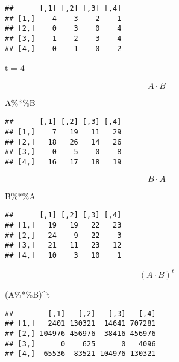 \documentclass[
]{article}
\newenvironment{Shaded}{\begin{snugshade}}{\end{snugshade}}
\newcommand{\DecValTok}[1]{\textcolor[rgb]{0.00,0.00,0.81}{#1}}
\newcommand{\NormalTok}[1]{#1}
\newcommand{\OtherTok}[1]{\textcolor[rgb]{0.56,0.35,0.01}{#1}}
\newcommand{\SpecialCharTok}[1]{\textcolor[rgb]{0.00,0.00,0.00}{#1}}
\begin{document}
\begin{verbatim}
##      [,1] [,2] [,3] [,4]
## [1,]    4    3    2    1
## [2,]    0    3    0    4
## [3,]    1    2    3    4
## [4,]    0    1    0    2
\end{verbatim}

\begin{Shaded}
\begin{Highlighting}[]
\NormalTok{t }\OtherTok{=} \DecValTok{4}
\end{Highlighting}
\end{Shaded}

\[A \cdot B\]

\begin{Shaded}
\begin{Highlighting}[]
\NormalTok{A}\SpecialCharTok{\%*\%}\NormalTok{B}
\end{Highlighting}
\end{Shaded}

\begin{verbatim}
##      [,1] [,2] [,3] [,4]
## [1,]    7   19   11   29
## [2,]   18   26   14   26
## [3,]    0    5    0    8
## [4,]   16   17   18   19
\end{verbatim}

\[B \cdot A\]

\begin{Shaded}
\begin{Highlighting}[]
\NormalTok{B}\SpecialCharTok{\%*\%}\NormalTok{A}
\end{Highlighting}
\end{Shaded}

\begin{verbatim}
##      [,1] [,2] [,3] [,4]
## [1,]   19   19   22   23
## [2,]   24    9   22    3
## [3,]   21   11   23   12
## [4,]   10    3   10    1
\end{verbatim}

\[(A \cdot B)^{t}\]

\begin{Shaded}
\begin{Highlighting}[]
\NormalTok{(A}\SpecialCharTok{\%*\%}\NormalTok{B)}\SpecialCharTok{\^{}}\NormalTok{t}
\end{Highlighting}
\end{Shaded}

\begin{verbatim}
##        [,1]   [,2]   [,3]   [,4]
## [1,]   2401 130321  14641 707281
## [2,] 104976 456976  38416 456976
## [3,]      0    625      0   4096
## [4,]  65536  83521 104976 130321
\end{verbatim}
\end{document}
